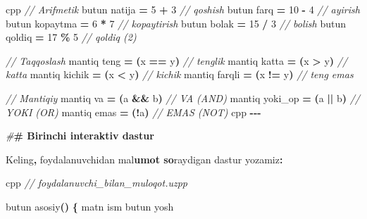 \documentclass[a4paper,11pt,twoside,openright]{book}
\newenvironment{Shaded}{\begin{snugshade}}{\end{snugshade}}
\newcommand{\CharTok}[1]{\textcolor[rgb]{0.31,0.60,0.02}{#1}}
\newcommand{\CommentTok}[1]{\textcolor[rgb]{0.56,0.35,0.01}{\textit{#1}}}
\newcommand{\DecValTok}[1]{\textcolor[rgb]{0.00,0.00,0.81}{#1}}
\newcommand{\ErrorTok}[1]{\textcolor[rgb]{0.64,0.00,0.00}{\textbf{#1}}}
\newcommand{\NormalTok}[1]{#1}
\newcommand{\OperatorTok}[1]{\textcolor[rgb]{0.81,0.36,0.00}{\textbf{#1}}}
\newcommand{\PreprocessorTok}[1]{\textcolor[rgb]{0.56,0.35,0.01}{\textit{#1}}}
\begin{document}
\begin{Shaded}
\begin{Highlighting}[]
\ErrorTok{\textasciigrave{}\textasciigrave{}\textasciigrave{}}\NormalTok{cpp}
\CommentTok{// Arifmetik}
\NormalTok{butun natija }\OperatorTok{=} \DecValTok{5} \OperatorTok{+} \DecValTok{3}    \CommentTok{// qo\textquotesingle{}shish}
\NormalTok{butun farq }\OperatorTok{=} \DecValTok{10} \OperatorTok{{-}} \DecValTok{4}     \CommentTok{// ayirish}
\NormalTok{butun kopaytma }\OperatorTok{=} \DecValTok{6} \OperatorTok{*} \DecValTok{7}  \CommentTok{// ko\textquotesingle{}paytirish}
\NormalTok{butun bolak }\OperatorTok{=} \DecValTok{15} \OperatorTok{/} \DecValTok{3}    \CommentTok{// bo\textquotesingle{}lish}
\NormalTok{butun qoldiq }\OperatorTok{=} \DecValTok{17} \OperatorTok{\%} \DecValTok{5}   \CommentTok{// qoldiq (2)}

\CommentTok{// Taqqoslash}
\NormalTok{mantiq teng }\OperatorTok{=} \OperatorTok{(}\NormalTok{x }\OperatorTok{==}\NormalTok{ y}\OperatorTok{)}   \CommentTok{// tenglik}
\NormalTok{mantiq katta }\OperatorTok{=} \OperatorTok{(}\NormalTok{x }\OperatorTok{\textgreater{}}\NormalTok{ y}\OperatorTok{)}   \CommentTok{// katta}
\NormalTok{mantiq kichik }\OperatorTok{=} \OperatorTok{(}\NormalTok{x }\OperatorTok{\textless{}}\NormalTok{ y}\OperatorTok{)}  \CommentTok{// kichik}
\NormalTok{mantiq farqli }\OperatorTok{=} \OperatorTok{(}\NormalTok{x }\OperatorTok{!=}\NormalTok{ y}\OperatorTok{)} \CommentTok{// teng emas}

\CommentTok{// Mantiqiy}
\NormalTok{mantiq va }\OperatorTok{=} \OperatorTok{(}\NormalTok{a }\OperatorTok{\&\&}\NormalTok{ b}\OperatorTok{)}     \CommentTok{// VA (AND)}
\NormalTok{mantiq yoki\_op }\OperatorTok{=} \OperatorTok{(}\NormalTok{a }\OperatorTok{||}\NormalTok{ b}\OperatorTok{)} \CommentTok{// YOKI (OR)}
\NormalTok{mantiq emas }\OperatorTok{=} \OperatorTok{(!}\NormalTok{a}\OperatorTok{)}       \CommentTok{// EMAS (NOT)}
\ErrorTok{\textasciigrave{}\textasciigrave{}\textasciigrave{}}\NormalTok{cpp}
\OperatorTok{{-}{-}{-}}

\PreprocessorTok{\#}\ErrorTok{\# Birinchi interaktiv dastur}

\NormalTok{Keling}\OperatorTok{,}\NormalTok{ foydalanuvchidan ma}\CharTok{\textquotesingle{}l}\ErrorTok{umot so}\CharTok{\textquotesingle{}}\NormalTok{raydigan dastur yozamiz}\OperatorTok{:}

\ErrorTok{\textasciigrave{}\textasciigrave{}\textasciigrave{}}\NormalTok{cpp}
\CommentTok{// foydalanuvchi\_bilan\_muloqot.uzpp}

\NormalTok{butun asosiy}\OperatorTok{()} \OperatorTok{\{}
\NormalTok{    matn ism}
\NormalTok{    butun yosh}


\end{Highlighting}
\end{Shaded}
\end{document}
